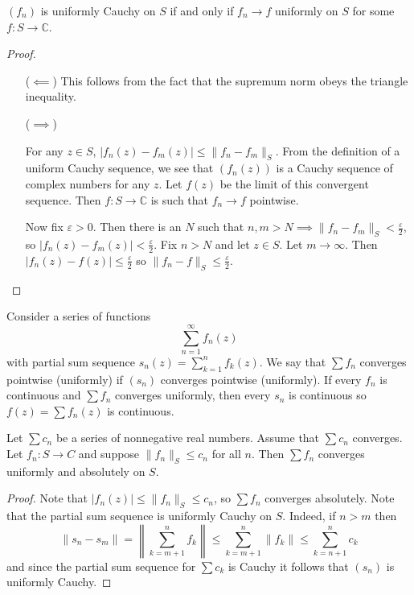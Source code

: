 \begin{theorem}
  $(f_n)$ is uniformly Cauchy on $S$ if and only if
  $f_n \to f$ uniformly on $S$ for some $f : S \to \mathbb{C}$.
\end{theorem}

\begin{proof}
  \begin{itemize}
    \item[($\impliedby$)]{
      This follows from the fact that the supremum norm
      obeys the triangle inequality.
    }
    \item[($\implies$)]{
      For any $z \in S$,
      $|f_n(z) - f_m(z)| \leq \| f_n - f_m \|_S$.
      From the definition of a uniform Cauchy sequence, we see that
      $(f_n(z))$ is a Cauchy sequence of complex numbers for any $z$.
      Let $f(z)$ be the limit of this convergent sequence. Then
      $f : S \to \mathbb{C}$ is such that $f_n \to f$ pointwise.

      Now fix $\varepsilon > 0$. Then there is an $N$ such that
      $n, m > N \implies \| f_n - f_m \|_S < \frac{\varepsilon}{2}$,
      so $|f_n(z) - f_m(z)| < \frac{\varepsilon}{2}$.
      Fix $n > N$ and let $z \in S$. Let $m \to \infty$. Then
      $|f_n(z) - f(z)| \leq \frac{\varepsilon}{2}$ so
      $\| f_n - f \|_S \leq \frac{\varepsilon}{2}$.
    }
  \end{itemize}
\end{proof}

Consider a series of functions
$$
\sum_{n=1}^\infty f_n(z)
$$
with partial sum sequence $s_n(z) = \sum_{k=1}^n f_k(z)$.
We say that $\sum f_n$ converges pointwise (uniformly) if $(s_n)$
converges pointwise (uniformly). If every $f_n$ is continuous and
$\sum f_n$ converges uniformly, then every $s_n$ is continuous
so $f(z) = \sum f_n(z)$ is continuous.

\begin{theorem}
  Let $\sum c_n$ be a series of nonnegative real numbers.
  Assume that $\sum c_n$ converges. Let $f_n : S \to C$
  and suppose $\| f_n \|_S \leq c_n$ for all $n$. Then
  $\sum f_n$ converges uniformly and absolutely on $S$.
\end{theorem}

\begin{proof}
  Note that $|f_n(z)| \leq \|f_n\|_S \leq c_n$, so
  $\sum f_n$ converges absolutely. Note that the
  partial sum sequence is uniformly Cauchy on $S$.
  Indeed, if $n > m$ then
  $$
       \| s_n - s_m \|
  =    \left\| \sum_{k=m+1}^n f_k \right\|
  \leq \sum_{k=m+1}^n \| f_k \| \leq \sum_{k=n+1}^n c_k
  $$
  and since the partial sum sequence for $\sum c_k$ is Cauchy
  it follows that $(s_n)$ is uniformly Cauchy.
\end{proof}
